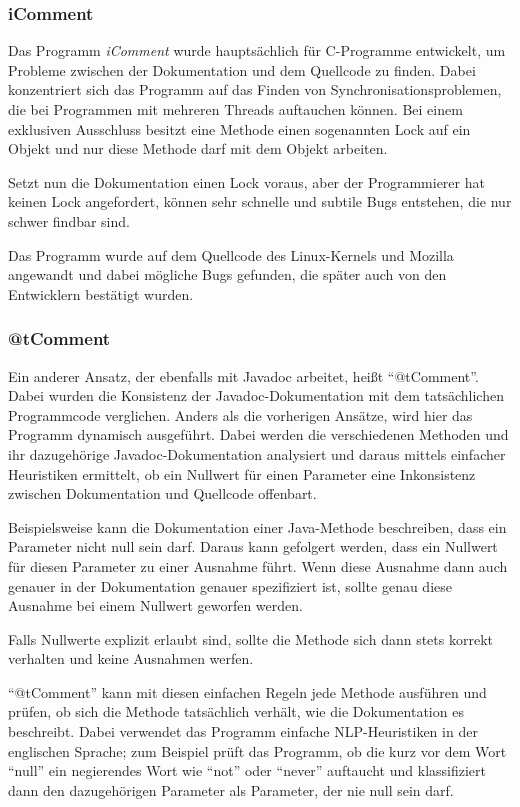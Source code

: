 \subsubsection{iComment}
Das Programm \textit{iComment}  wurde hauptsächlich für C-Programme entwickelt, um Probleme zwischen der Dokumentation und dem Quellcode zu finden. Dabei konzentriert sich das Programm auf das Finden von Synchronisationsproblemen, die bei Programmen mit mehreren Threads auftauchen können.  Bei einem exklusiven Ausschluss besitzt eine Methode einen sogenannten Lock auf ein Objekt und nur diese Methode darf mit dem Objekt arbeiten.

Setzt nun die Dokumentation einen Lock voraus, aber der Programmierer hat keinen Lock angefordert, können sehr schnelle und subtile Bugs entstehen, die nur schwer findbar sind. \cite[S. 145ff.]{icomment}

Das Programm wurde auf dem Quellcode des Linux-Kernels und Mozilla angewandt und dabei mögliche Bugs gefunden, die später auch von den Entwicklern bestätigt wurden\cite[S. 146.]{icomment}.
\subsubsection{@tComment}\label{@tComment}
Ein anderer Ansatz, der ebenfalls mit Javadoc arbeitet, heißt \enquote{@tComment}\cite[S. 1ff.]{@tComment:TestingJavadocCommentstoDetectComment-CodeInconsistencies}. Dabei wurden die Konsistenz der Javadoc-Dokumentation mit dem tatsächlichen Programmcode verglichen. Anders als die vorherigen Ansätze, wird hier das Programm dynamisch ausgeführt. Dabei werden die verschiedenen Methoden und ihr dazugehörige Javadoc-Dokumentation analysiert und daraus mittels einfacher Heuristiken ermittelt, ob ein  Nullwert für einen Parameter eine Inkonsistenz zwischen Dokumentation und Quellcode offenbart.

Beispielsweise kann die Dokumentation einer Java-Methode beschreiben, dass ein Parameter nicht null sein darf. Daraus kann gefolgert werden, dass ein Nullwert für diesen Parameter zu einer Ausnahme führt. Wenn diese Ausnahme dann auch genauer in der Dokumentation genauer spezifiziert ist, sollte genau diese Ausnahme bei einem Nullwert geworfen werden. 

Falls Nullwerte explizit erlaubt sind, sollte die Methode sich dann stets korrekt verhalten und keine Ausnahmen werfen. 

\enquote{@tComment} kann mit diesen einfachen Regeln jede Methode ausführen und prüfen, ob sich die Methode tatsächlich verhält, wie die Dokumentation es beschreibt. Dabei verwendet das Programm einfache \ac{NLP}-Heuristiken in der englischen Sprache; zum Beispiel prüft das Programm, ob die kurz vor dem Wort \enquote{null} ein negierendes Wort wie \enquote{not} oder \enquote{never} auftaucht und klassifiziert dann den dazugehörigen Parameter als Parameter, der nie null sein darf. 

